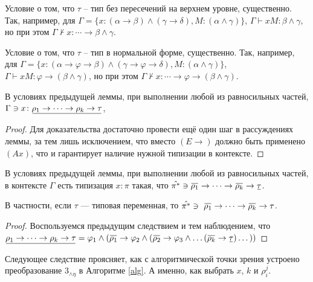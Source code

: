 \documentclass[../main.tex]{subfiles}
\begin{document}
\begin{notice}
    Условие о том, что $\tau$ -- тип без пересечений на верхнем уровне, существенно. Так, например, для $\Gamma = \{x \colon (\alpha \to \beta) \wedge (\gamma \to \delta), M \colon (\alpha \wedge \gamma)  \}$, $\Gamma \vdash xM \colon \beta \wedge \gamma$, но при этом $\Gamma \nvdash x \colon \cdots \to \beta \wedge \gamma$.
\end{notice}

\begin{notice}
    Условие о том, что $\tau$ -- тип в нормальной форме, существенно. Так, например, для $\Gamma = \{x \colon (\alpha \to \varphi \to \beta) \wedge (\gamma \to \varphi \to \delta), M \colon (\alpha \wedge \gamma)  \}$, $\Gamma \vdash xM \colon \varphi \to (\beta \wedge \gamma)$, но при этом $\Gamma \nvdash x \colon \cdots \to \varphi \to (\beta \wedge \gamma)$.
\end{notice}

\begin{corollary} \label{в контексте} 
    В условиях предыдущей леммы, при выполнении любой из равносильных частей, $\Gamma \ni x \colon \ub{\rho_1 \to \cdots \to \rho_k \to \tau}$,
\end{corollary}

\begin{proof}
Для доказательства достаточно провести ещё один шаг в рассуждениях леммы, за тем лишь исключением, что вместо $(E \to)$ должно быть применено $(Ax)$, что и гарантирует наличие нужной типизации в контексте.
\end{proof}

\begin{corollary} \label{в контексте при разложении}
    В условиях предыдущей леммы, при выполнении любой из равносильных частей, в контексте $\Gamma$ есть типизация $x \colon \pi$ такая, что $\hat{\pi^*} \ni \ob{\rho_1} \to \cdots \to \ob{\rho_k} \to \ub{\tau}$.
    
    В частности, если $\tau$ --- типовая переменная, то $\hat{\pi^*} \ni \ \ob{\rho_1} \to \cdots \to \ob{\rho_k}  \to \tau$.
\end{corollary}
\begin{proof}
    Воспользуемся предыдущим следствием и тем наблюдением, что 
    $\ub{\rho_1 \to \cdots \to \rho_k \to \tau} = \varphi_1 \wedge (\ob{\rho_1} \to \varphi_2 \wedge (\ob{\rho_2} \to \varphi_3 \wedge \dots(\ob{\rho_k} \to  \ub{\tau})\dots))$
\end{proof}


Следующее следствие проясняет, как с алгоритмической точки зрения устроено преобразование $3_{\wedge \eta}$ в Алгоритме \ref{alg}. А именно, как выбрать $x$, $k$ и $\rho_i^j$.
\end{document}

